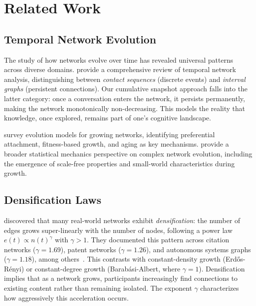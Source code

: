 \documentclass[10pt,letterpaper]{article}
\begin{document}
\section{Related Work}
\label{sec:related}

\subsection{Temporal Network Evolution}

The study of how networks evolve over time has revealed universal patterns across diverse domains. \citet{holme2012temporal} provide a comprehensive review of temporal network analysis, distinguishing between \emph{contact sequences} (discrete events) and \emph{interval graphs} (persistent connections). Our cumulative snapshot approach falls into the latter category: once a conversation enters the network, it persists permanently, making the network monotonically non-decreasing. This models the reality that knowledge, once explored, remains part of one's cognitive landscape.

\citet{dorogovtsev2002evolution} survey evolution models for growing networks, identifying preferential attachment, fitness-based growth, and aging as key mechanisms. \citet{albert2002statistical} provide a broader statistical mechanics perspective on complex network evolution, including the emergence of scale-free properties and small-world characteristics during growth.

\subsection{Densification Laws}

\citet{leskovec2005graphs} discovered that many real-world networks exhibit \emph{densification}: the number of edges grows super-linearly with the number of nodes, following a power law $e(t) \propto n(t)^\gamma$ with $\gamma > 1$. They documented this pattern across citation networks ($\gamma = 1.69$), patent networks ($\gamma = 1.26$), and autonomous systems graphs ($\gamma = 1.18$), among others~\citep{leskovec2007graph}. This contrasts with constant-density growth (Erd\H{o}s-R\'enyi) or constant-degree growth (Barab\'asi-Albert, where $\gamma = 1$). Densification implies that as a network grows, participants increasingly find connections to existing content rather than remaining isolated. The exponent $\gamma$ characterizes how aggressively this acceleration occurs.
\end{document}
